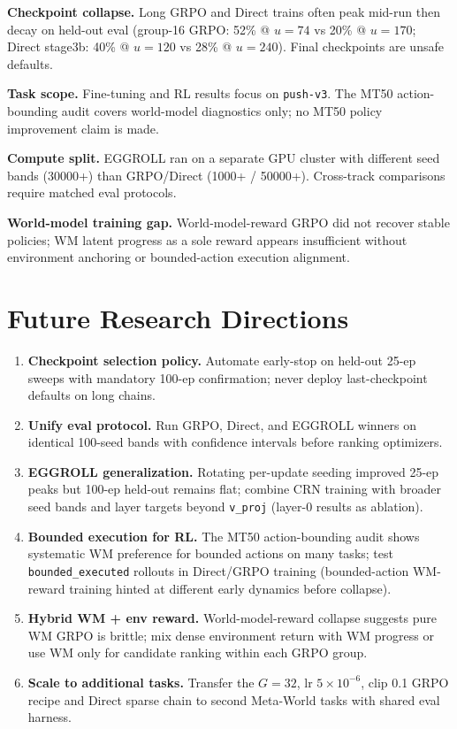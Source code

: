 \textbf{Checkpoint collapse.} Long GRPO and Direct trains often peak mid-run then decay on held-out eval (group-16 GRPO: 52\% @ $u{=}74$ vs 20\% @ $u{=}170$; Direct stage3b: 40\% @ $u{=}120$ vs 28\% @ $u{=}240$). Final checkpoints are unsafe defaults.

\textbf{Task scope.} Fine-tuning and RL results focus on \texttt{push-v3}. The MT50 action-bounding audit covers world-model diagnostics only; no MT50 policy improvement claim is made.

\textbf{Compute split.} EGGROLL ran on a separate GPU cluster with different seed bands (30000+) than GRPO/Direct (1000+ / 50000+). Cross-track comparisons require matched eval protocols.

\textbf{World-model training gap.} World-model-reward GRPO did not recover stable policies; WM latent progress as a sole reward appears insufficient without environment anchoring or bounded-action execution alignment.

\section{Future Research Directions}
\label{sec:future-work}

\begin{enumerate}
  \item \textbf{Checkpoint selection policy.} Automate early-stop on held-out 25-ep sweeps with mandatory 100-ep confirmation; never deploy last-checkpoint defaults on long chains.
  \item \textbf{Unify eval protocol.} Run GRPO, Direct, and EGGROLL winners on identical 100-seed bands with confidence intervals before ranking optimizers.
  \item \textbf{EGGROLL generalization.} Rotating per-update seeding improved 25-ep peaks but 100-ep held-out remains flat; combine CRN training with broader seed bands and layer targets beyond \texttt{v\_proj} (layer-0 results as ablation).
  \item \textbf{Bounded execution for RL.} The MT50 action-bounding audit shows systematic WM preference for bounded actions on many tasks; test \texttt{bounded\_executed} rollouts in Direct/GRPO training (bounded-action WM-reward training hinted at different early dynamics before collapse).
  \item \textbf{Hybrid WM + env reward.} World-model-reward collapse suggests pure WM GRPO is brittle; mix dense environment return with WM progress or use WM only for candidate ranking within each GRPO group.
  \item \textbf{Scale to additional tasks.} Transfer the $G{=}32$, lr $5{\times}10^{-6}$, clip 0.1 GRPO recipe and Direct sparse chain to second Meta-World tasks with shared eval harness.
\end{enumerate}
